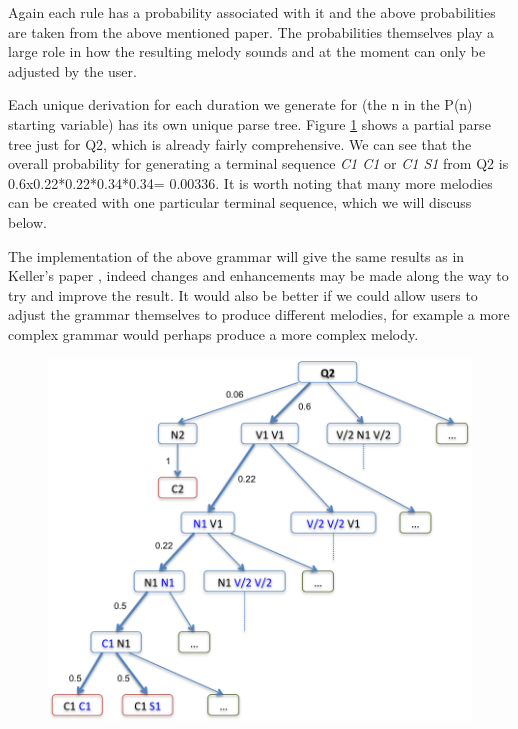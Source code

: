 \documentclass[pdftex,12pt,a4paper]{report}
\begin{document}
Again each rule has a probability associated with it and the above probabilities are taken from the above mentioned paper. The probabilities themselves play a large role in how the resulting melody sounds and at the moment can only be adjusted by the user.

Each unique derivation for each duration we generate for (the n in the P(n) starting variable) has its own unique parse tree. Figure \ref{fig:Q2parsetree} shows a partial parse tree just for Q2, which is already fairly comprehensive. We can see that the overall probability for generating a terminal sequence \emph{C1 C1} or \emph{C1 S1} from Q2 is 0.6x0.22*0.22*0.34*0.34= 0.00336. It is worth noting that many more melodies can be created with one particular terminal sequence, which we will discuss below.

The implementation of the above grammar will give the same results as in Keller's paper \cite{keller07}, indeed changes and enhancements may be made along the way to try and improve the result. 
It would also be better if we could allow users to adjust the grammar themselves to produce different melodies, for example a more complex grammar would perhaps produce a more complex melody. 

\begin{figure}[here]
  \centering
  \includegraphics[scale=0.8]{figure/Q2parsetree.png}
  \label{fig:Q2parsetree}
\end{figure}
\end{document}
